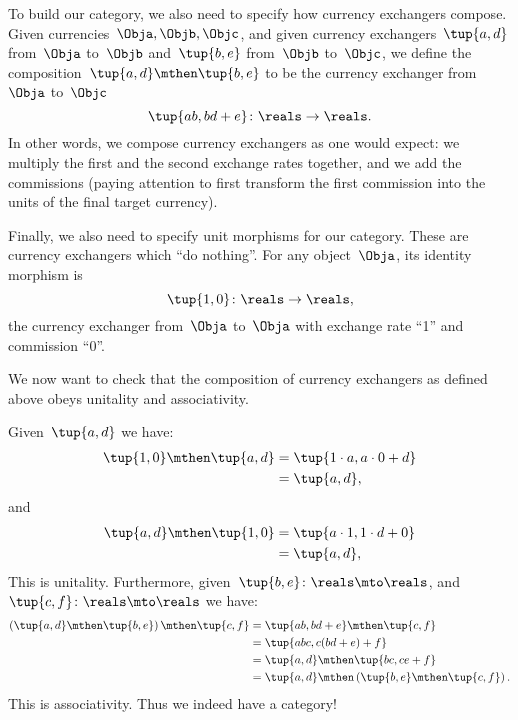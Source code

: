 To build our category, we also need to specify how currency exchangers compose.
Given currencies~$\Obja, \Objb, \Objc$, and given currency exchangers~$\tup{a,d}$ from~$\Obja$ to~$\Objb$ and~$\tup{b,e}$ from~$\Objb$ to~$\Objc$,
we define the composition~$\tup{a,d} \mthen \tup{b,e}$ to be the currency exchanger from~$\Obja$ to~$\Objc$
\begin{equation}
	\label{eq:comp-law-curr}
	\tup{ab,bd+e} \colon \reals \to \reals.
\end{equation}
In other words, we compose currency exchangers as one would expect: we multiply the first and the second exchange rates together, and we add the commissions (paying attention to first transform the first commission into the units of the final target currency).

Finally, we also need to specify unit morphisms for our category.
These are currency exchangers which ``do nothing''.
For any object~$\Obja$, its identity morphism is
\begin{equation*}
	\tup{1,0} \colon \reals \to \reals,
\end{equation*}
the currency exchanger from~$\Obja$ to~$\Obja$ with exchange rate ``1'' and commission ``0''.

We now want to check that the composition of currency exchangers as defined above obeys unitality and associativity.

Given~$\tup{a,d}$ we have:
\begin{equation*}
	\begin{aligned}
		\tup{1,0}\mthen\tup{a,d} & =\tup{1\cdot a, a\cdot 0+d} \\
		                         & =\tup{a,d},
	\end{aligned}
\end{equation*}
and
\begin{equation*}
	\begin{aligned}
		\tup{a,d}\mthen \tup{1,0} & =\tup{a\cdot 1, 1\cdot d+0} \\
		                          & =\tup{a,d},
	\end{aligned}
\end{equation*}
This is unitality.
Furthermore, given~$\tup{b,e}\colon \reals \mto \reals$, and~$\tup{c,f}\colon \reals \mto \reals$ we have:
\begin{equation*}
	\begin{aligned}
		\left( \tup{a,d}\mthen \tup{b,e}\right)\mthen \tup{c,f} & =\tup{ab,bd+e}\mthen \tup{c,f}                            \\
		                                                        & =\tup{abc,c(bd+e)+f}                                      \\
		                                                        & =\tup{a,d}\mthen \tup{bc,ce+f}                            \\
		                                                        & =\tup{a,d}\mthen \left( \tup{b,e}\mthen \tup{c,f}\right).
	\end{aligned}
\end{equation*}
This is associativity.
Thus we indeed have a category!

